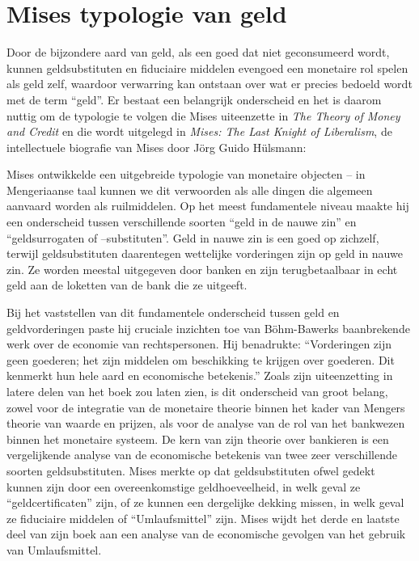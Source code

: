 \hypertarget{mises-typologie-van-geld}{%
\section{Mises\textquotesingle{} typologie van geld}\label{mises-typologie-van-geld}}

Door de bijzondere aard van geld, als een goed dat niet geconsumeerd wordt, kunnen geldsubstituten en fiduciaire middelen evengoed een monetaire rol spelen als geld zelf, waardoor verwarring kan ontstaan over wat er precies bedoeld wordt met de term ``geld''. Er bestaat een belangrijk onderscheid en het is daarom nuttig om de typologie te volgen die Mises uiteenzette in \emph{The Theory of Money and Credit} en die wordt uitgelegd in \emph{Mises: The Last Knight of Liberalism},\autocite{169} de intellectuele biografie van Mises door Jörg Guido Hülsmann:

\begin{blockquotebox}
    Mises ontwikkelde een uitgebreide typologie van monetaire objecten -- in Mengeriaanse taal kunnen we dit verwoorden als alle dingen die algemeen aanvaard worden als ruilmiddelen. Op het meest fundamentele niveau maakte hij een onderscheid tussen verschillende soorten ``geld in de nauwe zin'' en ``geldsurrogaten of --substituten''. Geld in nauwe zin is een goed op zichzelf, terwijl geldsubstituten daarentegen wettelijke vorderingen zijn op geld in nauwe zin. Ze worden meestal uitgegeven door banken en zijn terugbetaalbaar in echt geld aan de loketten van de bank die ze uitgeeft.
    \par\vspace{1em}\noindent
    Bij het vaststellen van dit fundamentele onderscheid tussen geld en geldvorderingen paste hij cruciale inzichten toe van Böhm-Bawerk\textquotesingle s baanbrekende werk over de economie van rechtspersonen. Hij benadrukte: ``Vorderingen zijn geen goederen; het zijn middelen om beschikking te krijgen over goederen. Dit kenmerkt hun hele aard en economische betekenis.'' Zoals zijn uiteenzetting in latere delen van het boek zou laten zien, is dit onderscheid van groot belang, zowel voor de integratie van de monetaire theorie binnen het kader van Mengers theorie van waarde en prijzen, als voor de analyse van de rol van het bankwezen binnen het monetaire systeem. De kern van zijn theorie over bankieren is een vergelijkende analyse van de economische betekenis van twee zeer verschillende soorten geldsubstituten. Mises merkte op dat geldsubstituten ofwel gedekt kunnen zijn door een overeenkomstige geldhoeveelheid, in welk geval ze ``geldcertificaten'' zijn, of ze kunnen een dergelijke dekking missen, in welk geval ze fiduciaire middelen of ``Umlaufsmittel'' zijn. Mises wijdt het derde en laatste deel van zijn boek aan een analyse van de economische gevolgen van het gebruik van Umlaufsmittel.\footnotemark
\end{blockquotebox}

